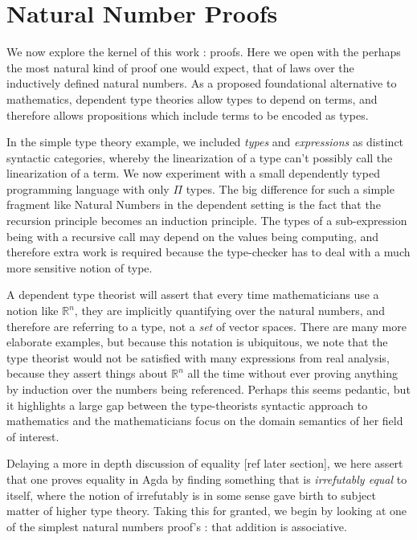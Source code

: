 \section{Natural Number Proofs}

We now explore the kernel of this work : proofs. Here we open with the perhaps
the most natural kind of proof one would expect, that of laws over the
inductively defined natural numbers. As a proposed foundational alternative to
mathematics, dependent type theories allow types to depend on terms, and
therefore allows propositions which include terms to be encoded as types.

In the simple type theory example, we included \emph{types} and
\emph{expressions} as distinct syntactic categories, whereby the linearization
of a type can't possibly call the linearization of a term. We now experiment
with a small dependently typed programming language with only $\Pi$ types. The
big difference for such a simple fragment like Natural Numbers in the dependent
setting is the fact that the recursion principle becomes an induction principle.
The types of a sub-expression being with a recursive call may depend on
the values being computing, and therefore extra work is required because the
type-checker has to deal with a much more sensitive notion of type.

A dependent type theorist will assert that every time mathematicians use a
notion like $\mathbb{R}^n$, they are implicitly quantifying over the natural
numbers, and therefore are referring to a type, not a \emph{set} of vector spaces.
There are many more elaborate examples, but because this notation is ubiquitous,
we note that the type theorist would not be satisfied with many expressions
from real analysis, because they assert things about $\mathbb{R}^n$ all the time
without ever proving anything by induction over the numbers being referenced.
Perhaps this seems pedantic, but it highlights a large gap between the
type-theorists syntactic approach to mathematics and the mathematicians focus on
the domain semantics of her field of interest.

Delaying a more in depth discussion of equality [ref later section], we here
assert that one proves equality in Agda by finding something that is \emph{irrefutably
equal} to itself, where the notion of irrefutably is in some sense gave birth to
subject matter of higher type theory.  Taking this for granted, we begin by
looking at one of the simplest natural numbers proof's : that addition is
associative.

